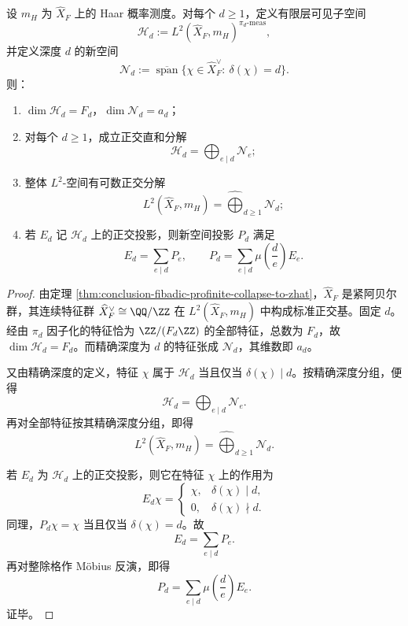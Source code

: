 \begin{theorem}\label{thm:conclusion-fibadic-newspace-orthogonal-decomposition}
设 \(m_H\) 为 \(\widehat X_F\) 上的 Haar 概率测度。对每个 \(d\ge 1\)，定义有限层可见子空间
\[
\mathcal H_d:=L^2(\widehat X_F,m_H)^{\pi_d\text{-meas}},
\]
并定义深度 \(d\) 的新空间
\[
\mathcal N_d
:=
\overline{\operatorname{span}}
\{\chi\in \widehat X_F^\vee:\ \delta(\chi)=d\}.
\]
则：
\begin{enumerate}
  \item \(\dim \mathcal H_d=F_d\)，\(\dim \mathcal N_d=a_d\)；
  \item 对每个 \(d\ge 1\)，成立正交直和分解
  \[
  \mathcal H_d=\bigoplus_{e\mid d}\mathcal N_e;
  \]
  \item 整体 \(L^2\)-空间有可数正交分解
  \[
  L^2(\widehat X_F,m_H)
  =
  \widehat{\bigoplus}_{d\ge 1}\mathcal N_d;
  \]
  \item 若 \(E_d\) 记 \(\mathcal H_d\) 上的正交投影，则新空间投影 \(P_d\) 满足
  \[
  E_d=\sum_{e\mid d}P_e,
  \qquad
  P_d=\sum_{e\mid d}\mu\!\left(\frac{d}{e}\right)E_e.
  \]
\end{enumerate}
\end{theorem}
\begin{proof}
由定理 \ref{thm:conclusion-fibadic-profinite-collapse-to-zhat}，\(\widehat X_F\) 是紧阿贝尔群，其连续特征群 \(\widehat X_F^\vee\cong \QQ/\ZZ\) 在 \(L^2(\widehat X_F,m_H)\) 中构成标准正交基。固定 \(d\)。经由 \(\pi_d\) 因子化的特征恰为 \(\ZZ/(F_d\ZZ)\) 的全部特征，总数为 \(F_d\)，故 \(\dim \mathcal H_d=F_d\)。而精确深度为 \(d\) 的特征张成 \(\mathcal N_d\)，其维数即 \(a_d\)。

又由精确深度的定义，特征 \(\chi\) 属于 \(\mathcal H_d\) 当且仅当 \(\delta(\chi)\mid d\)。按精确深度分组，便得
\[
\mathcal H_d=\bigoplus_{e\mid d}\mathcal N_e.
\]
再对全部特征按其精确深度分组，即得
\[
L^2(\widehat X_F,m_H)
=
\widehat{\bigoplus}_{d\ge 1}\mathcal N_d.
\]

若 \(E_d\) 为 \(\mathcal H_d\) 上的正交投影，则它在特征 \(\chi\) 上的作用为
\[
E_d\chi=
\begin{cases}
\chi,& \delta(\chi)\mid d,\\
0,& \delta(\chi)\nmid d.
\end{cases}
\]
同理，\(P_d\chi=\chi\) 当且仅当 \(\delta(\chi)=d\)。故
\[
E_d=\sum_{e\mid d}P_e.
\]
再对整除格作 Möbius 反演，即得
\[
P_d=\sum_{e\mid d}\mu\!\left(\frac{d}{e}\right)E_e.
\]
证毕。
\end{proof}

